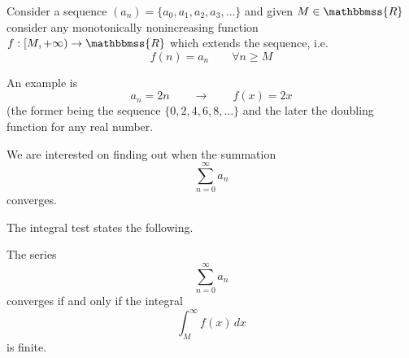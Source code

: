\documentclass[12pt]{article}
\newcommand{\R}{\mathbbmss{R}}
\begin{document}
Consider a sequence $(a_n)=\{a_0,a_1,a_2,a_3,\ldots\}$ 
and given $M\in \R$ consider any monotonically nonincreasing function $f:[M,+\infty)\to \R$ which extends the sequence, i.e.
\[
  f(n) = a_n \qquad \forall n\ge M
\]

An example is
$$a_n = 2n\qquad \to\qquad f(x) = 2x$$
(the former being the sequence $\{0,2,4,6,8,\ldots\}$ and the later the doubling function for any real number.

We are interested on finding out when the summation
$$\sum_{n = 0}^{\infty}a_n$$
converges.

The integral test states the following.

The series
$$\sum_{n = 0}^{\infty}a_n$$
converges if and only if the integral
$$\int_M^\infty f(x)\, dx$$
is finite.
\end{document}
